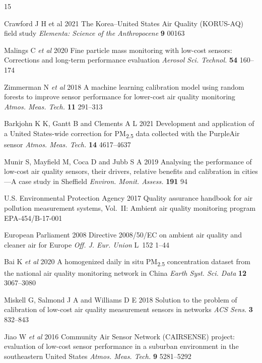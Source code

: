 \documentclass[12pt]{article}
\begin{document}
\begin{thebibliography}{15}

Crawford J H et al 2021 The Korea--United States Air Quality (KORUS-AQ) field study \textit{Elementa: Science of the Anthropocene} \textbf{9} 00163

Malings C \textit{et al} 2020 Fine particle mass monitoring with low-cost sensors: Corrections and long-term performance evaluation \textit{Aerosol Sci. Technol.} \textbf{54} 160--174

Zimmerman N \textit{et al} 2018 A machine learning calibration model using random forests to improve sensor performance for lower-cost air quality monitoring \textit{Atmos. Meas. Tech.} \textbf{11} 291--313

Barkjohn K K, Gantt B and Clements A L 2021 Development and application of a United States-wide correction for PM\textsubscript{2.5} data collected with the PurpleAir sensor \textit{Atmos. Meas. Tech.} \textbf{14} 4617--4637

Munir S, Mayfield M, Coca D and Jubb S A 2019 Analysing the performance of low-cost air quality sensors, their drivers, relative benefits and calibration in cities---A case study in Sheffield \textit{Environ. Monit. Assess.} \textbf{191} 94

U.S. Environmental Protection Agency 2017 Quality assurance handbook for air pollution measurement systems, Vol.~II: Ambient air quality monitoring program EPA-454/B-17-001

European Parliament 2008 Directive 2008/50/EC on ambient air quality and cleaner air for Europe \textit{Off. J. Eur. Union} L~152 1--44

Bai K \textit{et al} 2020 A homogenized daily in situ PM\textsubscript{2.5} concentration dataset from the national air quality monitoring network in China \textit{Earth Syst. Sci. Data} \textbf{12} 3067--3080

Miskell G, Salmond J A and Williams D E 2018 Solution to the problem of calibration of low-cost air quality measurement sensors in networks \textit{ACS Sens.} \textbf{3} 832--843

Jiao W \textit{et al} 2016 Community Air Sensor Network (CAIRSENSE) project: evaluation of low-cost sensor performance in a suburban environment in the southeastern United States \textit{Atmos. Meas. Tech.} \textbf{9} 5281--5292


\end{thebibliography}
\end{document}
